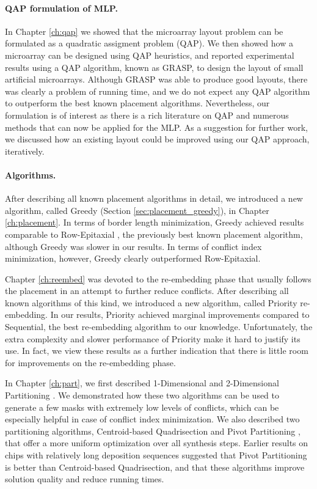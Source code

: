\paragraph{QAP formulation of MLP.} In Chapter \ref{ch:qap} we showed that the
microarray layout problem can be formulated as a quadratic assigment problem
(QAP). We then showed how a microarray can be designed using QAP heuristics, and
reported experimental results using a QAP algorithm, known as GRASP, to design
the layout of small artificial microarrays. Although GRASP was able to produce
good layouts, there was clearly a problem of running time, and we do not expect
any QAP algorithm to outperform the best known placement algorithms.
Nevertheless, our formulation is of interest as there is a rich literature on
QAP and numerous methods that can now be applied for the MLP. As a suggestion
for further work, we discussed how an existing layout could be improved using
our QAP approach, iteratively.

\paragraph{Algorithms.} After describing all known placement algorithms in
detail, we introduced a new algorithm, called Greedy (Section
\ref{sec:placement_greedy}), in Chapter \ref{ch:placement}. In terms of border
length minimization, Greedy achieved results comparable to Row-Epitaxial
\citep{Kahng2003}, the previously best known placement algorithm, although
Greedy was slower in our results. In terms of conflict index minimization,
however, Greedy clearly outperformed Row-Epitaxial.

Chapter \ref{ch:reembed} was devoted to the re-embedding phase that usually
follows the placement in an attempt to further reduce conflicts. After
describing all known algorithms of this kind, we introduced a new algorithm,
called Priority re-embedding. In our results, Priority achieved marginal
improvements compared to Sequential, the best re-embedding algorithm to our
knowledge. Unfortunately, the extra complexity and slower performance of
Priority make it hard to justify its use. In fact, we view these results as a
further indication that there is little room for improvements on the
re-embedding phase.

In Chapter \ref{ch:part}, we first described 1-Dimensional and 2-Dimensional
Partitioning \citep{Carvalho2007}. We demonstrated how these two algorithms can
be used to generate a few masks with extremely low levels of conflicts, which
can be especially helpful in case of conflict index minimization. We also
described two partitioning algorithms, Centroid-based Quadrisection
\citep{Kahng2003a} and Pivot Partitioning \citep{Carvalho2006}, that offer a
more uniform optimization over all synthesis steps. Earlier results on chips
with relatively long deposition sequences suggested that Pivot Partitioning is
better than Centroid-based Quadrisection, and that these algorithms improve
solution quality and reduce running times.

